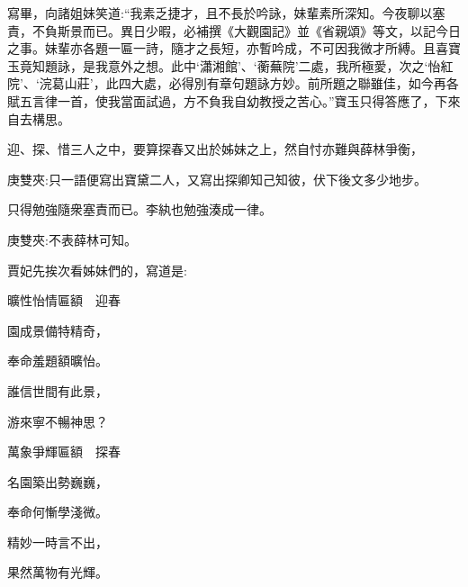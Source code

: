 \begin{parag}
    寫畢，向諸姐妹笑道:“我素乏捷才，且不長於吟詠，妹輩素所深知。今夜聊以塞責，不負斯景而已。異日少暇，必補撰《大觀園記》並《省親頌》等文，以記今日之事。妹輩亦各題一匾一詩，隨才之長短，亦暫吟成，不可因我微才所縛。且喜寶玉竟知題詠，是我意外之想。此中‘瀟湘館’、‘蘅蕪院’二處，我所極愛，次之‘怡紅院’、‘浣葛山莊’，此四大處，必得別有章句題詠方妙。前所題之聯雖佳，如今再各賦五言律一首，使我當面試過，方不負我自幼教授之苦心。”寶玉只得答應了，下來自去構思。
\end{parag}


\begin{parag}
    迎、探、惜三人之中，要算探春又出於姊妹之上，然自忖亦難與薛林爭衡，\begin{note}庚雙夾:只一語便寫出寶黛二人，又寫出探卿知己知彼，伏下後文多少地步。\end{note}只得勉強隨衆塞責而已。李紈也勉強湊成一律。\begin{note}庚雙夾:不表薛林可知。\end{note}賈妃先挨次看姊妹們的，寫道是:
\end{parag}


\begin{poem}
    \begin{pl}曠性怡情匾額　迎春\end{pl}

    \begin{pl}園成景備特精奇，\end{pl}

    \begin{pl}奉命羞題額曠怡。\end{pl}

    \begin{pl}誰信世間有此景，\end{pl}

    \begin{pl}游來寧不暢神思？\end{pl}
\end{poem}


\begin{poem}
    \begin{pl}萬象爭輝匾額　探春\end{pl}

    \begin{pl}名園築出勢巍巍，\end{pl}

    \begin{pl}奉命何慚學淺微。\end{pl}

    \begin{pl}精妙一時言不出，\end{pl}

    \begin{pl}果然萬物有光輝。\end{pl}
\end{poem}



